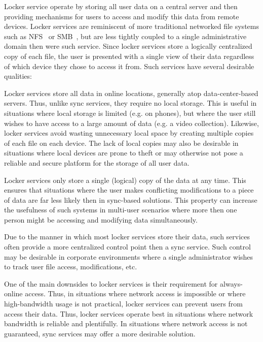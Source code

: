 Locker service operate by storing all user data on a central server
and then providing mechanisms for users to access and modify this data
from remote devices. Locker services are reminiscent of more
traditional networked file systems such as NFS~\cite{sandberg1985} or
SMB~\cite{microsoft-smb2}, but are less tightly coupled to a single
administrative domain then were such service. Since locker services
store a logically centralized copy of each file, the user is presented
with a single view of their data regardless of which device they chose
to access it from. Such services have several desirable qualities:

\begin{packed_desc}
\item[No Local Storage:] Locker services store all data in online
  locations, generally atop data-center-based servers. Thus, unlike
  sync services, they require no local storage. This is useful in
  situations where local storage is limited (e.g. on phones), but
  where the user still wishes to have access to a large amount of data
  (e.g. a video collection). Likewise, locker services avoid wasting
  unnecessary local space by creating multiple copies of each file on
  each device. The lack of local copies may also be desirable in
  situations where local devices are prone to theft or may otherwise
  not pose a reliable and secure platform for the storage of all user
  data.
\item[Single Source of Truth:] Locker services only store a single
  (logical) copy of the data at any time. This ensures that situations
  where the user makes conflicting modifications to a piece of data
  are far less likely then in sync-based solutions. This property can
  increase the usefulness of such systems in multi-user scenarios
  where more then one person might be accessing and modifying data
  simultaneously.
\item[Centralized Control:] Due to the manner in which most locker
  services store their data, such services often provide a more
  centralized control point then a sync service. Such control may be
  desirable in corporate environments where a single administrator
  wishes to track user file access, modifications, etc.
\end{packed_desc}

One of the main downsides to locker services is their requirement for
always-online access. Thus, in situations where network access is
impossible or where high-bandwidth usage is not practical, locker
services can prevent users from access their data. Thus, locker
services operate best in situations where network bandwidth is
reliable and plentifully. In situations where network access is not
guaranteed, sync services may offer a more desirable solution.

